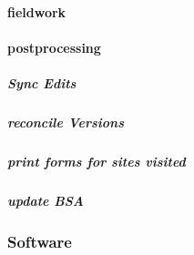\documentclass[class=article , crop=false, titlepage, twoside, multi={itemize, figure, verbatim}, float=false]{standalone}
\begin{document}
\paragraph{fieldwork}

\paragraph{postprocessing}

\subparagraph{Sync Edits}

\subparagraph{reconcile Versions}

\subparagraph{print forms for sites visited}

\subparagraph{update BSA}

\clearpage
\subsubsection{Software}
\clearpage
\end{document}
